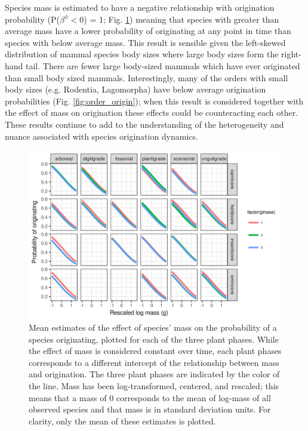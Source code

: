 \documentclass[12pt,letterpaper]{article}
\begin{document}
Species mass is estimated to have a negative relationship with origination probability (P(\(\beta^{\phi} < 0\)) = 1; Fig. \ref{fig:mass_origin}) meaning that species with greater than average mass have a lower probability of originating at any point in time than species with below average mass. This result is sensible given the left-skewed distribution of mammal species body sizes where large body sizes form the right-hand tail. There are fewer large body-sized mammals which have ever originated than small body sized mammals. Interestingly, many of the orders with small body sizes (e.g. Rodentia, Lagomorpha) have below average origination probabilities (Fig. \ref{fig:order_origin}); when this result is considered together with the effect of mass on origination these effects could be counteracting each other. These results continue to add to the understanding of the heterogeneity and nuance associated with species origination dynamics.
\begin{figure}[ht]
  \centering
  \includegraphics[width=\textwidth,height=0.4\textheight,keepaspectratio=true]{figure/mass_on_origin_bd}
  \caption{Mean estimates of the effect of species' mass on the probability of a species originating, plotted for each of the three plant phases. While the effect of mass is considered constant over time, each plant phases corresponds to a different intercept of the relationship between mass and origination. The three plant phases are indicated by the color of the line. Mass has been log-transformed, centered, and rescaled; this means that a mass of 0 corresponds to the mean of log-mass of all observed species and that mass is in standard deviation units. For clarity, only the mean of these estimates is plotted.}
  \label{fig:mass_origin}
\end{figure}
\end{document}
